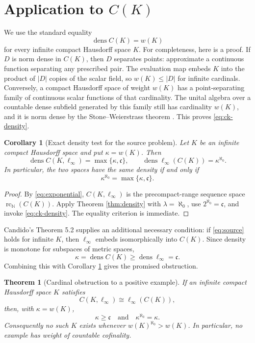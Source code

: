 \documentclass[11pt]{article}
\newtheorem{theorem}{Theorem}
\newtheorem{corollary}{Corollary}
\newcommand{\N}{\mathbb N}
\newcommand{\dens}{\operatorname{dens}}
\newcommand{\rc}{\operatorname{rc}}
\newcommand{\cardc}{\mathfrak c}
\begin{document}
\section*{Application to \(C(K)\)}

We use the standard equality
\[
 \dens C(K)=w(K)
 \tag{6}\label{eq:ck-density}
\]
for every infinite compact Hausdorff space \(K\). For completeness, here is
a proof. If \(D\) is norm dense in \(C(K)\), then \(D\) separates points:
approximate a continuous function separating any prescribed pair. The
evaluation map embeds \(K\) into the product of \(|D|\) copies of the scalar
field, so \(w(K)\le |D|\) for infinite cardinals. Conversely, a compact
Hausdorff space of weight \(w(K)\) has a point-separating family of continuous
scalar functions of that cardinality. The unital algebra over a countable
dense subfield generated by this family still has cardinality \(w(K)\), and
it is norm dense by the Stone--Weierstrass theorem \cite[Chapter 7]{Rudin}.
This proves \eqref{eq:ck-density}.

\begin{corollary}[Exact density test for the source problem]
\label{cor:ck}
Let \(K\) be an infinite compact Hausdorff space and put
\(\kappa=w(K)\). Then
\[
 \dens C(K,\ell_\infty)=\max\{\kappa,\cardc\},
 \qquad
 \dens\ell_\infty(C(K))=\kappa^{\aleph_0}.
 \tag{7}\label{eq:ck-formulas}
\]
In particular, the two spaces have the same density if and only if
\[
 \kappa^{\aleph_0}=\max\{\kappa,\cardc\}.
 \tag{8}\label{eq:density-equality}
\]
\end{corollary}

\begin{proof}
By \eqref{eq:exponential}, \(C(K,\ell_\infty)\) is the precompact-range
sequence space \(\rc_\N(C(K))\). Apply Theorem \ref{thm:density} with
\(\lambda=\aleph_0\), use \(2^{\aleph_0}=\cardc\), and invoke
\eqref{eq:ck-density}. The equality criterion is immediate.
\end{proof}

Candido's Theorem 5.2 supplies an additional necessary condition: if
\eqref{eq:source} holds for infinite \(K\), then \(\ell_\infty\) embeds
isomorphically into \(C(K)\). Since density is monotone for subspaces of
metric spaces,
\[
 \kappa=\dens C(K)\ge\dens\ell_\infty=\cardc.
\]
Combining this with Corollary \ref{cor:ck} gives the promised obstruction.

\begin{theorem}[Cardinal obstruction to a positive example]
\label{thm:obstruction}
If an infinite compact Hausdorff space \(K\) satisfies
\[
 C(K,\ell_\infty)\cong\ell_\infty(C(K)),
\]
then, with \(\kappa=w(K)\),
\[
 \boxed{\ \kappa\ge\cardc
 \quad\text{and}\quad
 \kappa^{\aleph_0}=\kappa.\ }
 \tag{9}\label{eq:boxed}
\]
Consequently no such \(K\) exists whenever
\(w(K)^{\aleph_0}>w(K)\). In particular, no example has weight of countable
cofinality.
\end{theorem}
\end{document}
